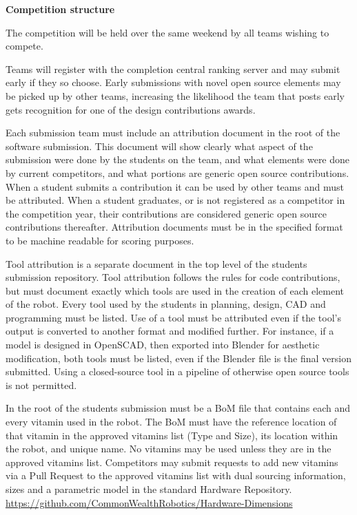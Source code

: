 \documentclass{article}
\begin{document}
 \pagebreak

{\huge \textbf{Competition structure}}

The competition will be held over the same weekend by all teams wishing to compete. 

Teams will register with the completion central ranking server and may submit early if they so choose. Early submissions with novel open source elements may be picked up by other teams, increasing the likelihood the team that posts early gets recognition for one of the design contributions awards.

Each submission team must include an attribution document in the root of the software submission. This document will show clearly what aspect of the submission were done by the students on the team, and what elements were done by current competitors, and what portions are generic open source contributions. When a student submits a contribution it can be used by other teams and must be attributed. When a student graduates, or is not registered as a competitor in the competition year, their contributions are considered generic open source contributions thereafter.  Attribution documents must be in the specified format to be machine readable for scoring purposes. 

Tool attribution is a separate document in the top level of the students submission repository. Tool attribution follows the rules for code contributions, but must document exactly which tools are used in the creation of each element of the robot. Every tool used by the students in planning, design, CAD and programming must be listed. Use of a tool must be attributed even if the tool's output is converted to another format and modified further. For instance, if a model is designed in OpenSCAD, then exported into Blender for aesthetic modification, both tools must be listed, even if the Blender file is the final version submitted. Using a closed-source tool in a pipeline of otherwise open source tools is not permitted. 

In the root of the students submission must be a BoM file that contains each and every vitamin used in the robot. The BoM must have the reference location of that vitamin in the approved vitamins list (Type and Size), its location within the robot, and unique name. No vitamins may be used unless they are in the approved vitamins list. Competitors may submit requests to add new vitamins via a Pull Request to the approved vitamins list with dual sourcing information, sizes and a parametric model in the standard Hardware Repository. \url{https://github.com/CommonWealthRobotics/Hardware-Dimensions} 
\end{document}

